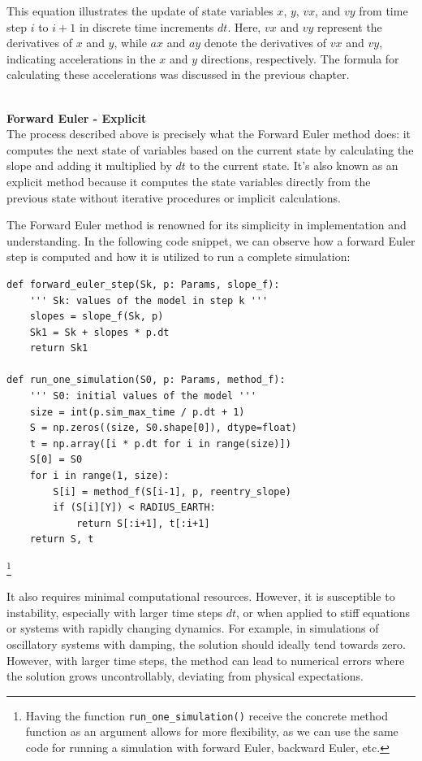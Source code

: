 \documentclass[runningheads]{llncs}
\begin{document}
This equation illustrates the update of state variables \( x \), \( y \), \( vx \), and \( vy \) from time step \( i \) to \( i+1 \) in discrete time increments \( dt \). Here, \( vx \) and \( vy \) represent the derivatives of \( x \) and \( y \), while \( ax \) and \( ay \) denote the derivatives of \( vx \) and \( vy \), indicating accelerations in the \( x \) and \( y \) directions, respectively. The formula for calculating these accelerations was discussed in the previous chapter.


\textbf{\\Forward Euler - Explicit\\}
The process described above is precisely what the Forward Euler method does: it computes the next state of variables based on the current state by calculating the slope and adding it multiplied by \( dt \) to the current state. It's also known as an explicit method because it computes the state variables directly from the previous state without iterative procedures or implicit calculations.

The Forward Euler method is renowned for its simplicity in implementation and understanding. In the following code snippet, we can observe how a forward Euler step is computed and how it is utilized to run a complete simulation:

\begin{verbatim}
def forward_euler_step(Sk, p: Params, slope_f): 
    ''' Sk: values of the model in step k '''
    slopes = slope_f(Sk, p)
    Sk1 = Sk + slopes * p.dt
    return Sk1

def run_one_simulation(S0, p: Params, method_f):
    ''' S0: initial values of the model '''
    size = int(p.sim_max_time / p.dt + 1)
    S = np.zeros((size, S0.shape[0]), dtype=float)
    t = np.array([i * p.dt for i in range(size)])
    S[0] = S0
    for i in range(1, size):
        S[i] = method_f(S[i-1], p, reentry_slope)
        if (S[i][Y]) < RADIUS_EARTH:
            return S[:i+1], t[:i+1]
    return S, t
\end{verbatim}
\footnote{Having the function \texttt{run\_one\_simulation()} receive the concrete method function as an argument allows for more flexibility, as we can use the same code for running a simulation with forward Euler, backward Euler, etc.}


It also requires minimal computational resources. However, it is susceptible to instability, especially with larger time steps \( dt \), or when applied to stiff equations or systems with rapidly changing dynamics. For example, in simulations of oscillatory systems with damping, the solution should ideally tend towards zero. However, with larger time steps, the method can lead to numerical errors where the solution grows uncontrollably, deviating from physical expectations.
\end{document}
